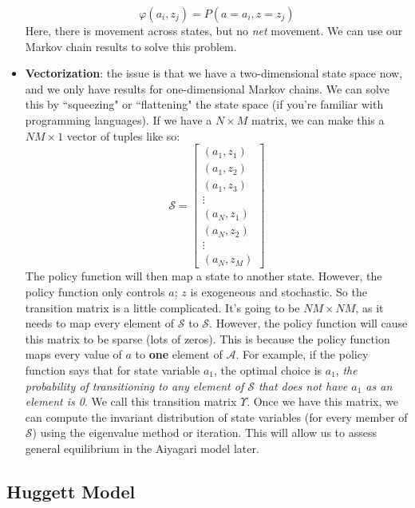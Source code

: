 \documentclass[12pt]{article}
\begin{document}
\begin{itemize}
    \[\varphi(a_i,z_j) = P(a=a_i,z=z_j)\]
    Here, there is movement across states, but no \textit{net} movement. We can use our Markov chain results to solve this problem.
    \item \textbf{Vectorization}: the issue is that we have a two-dimensional state space now, and we only have results for one-dimensional Markov chains. We can solve this by ``squeezing" or ``flattening" the state space (if you're familiar with programming languages). If we have a $N\times M$ matrix, we can make this a $NM\times 1$ vector of tuples like so:
    \[\mathcal{S} = \begin{bmatrix}
    (a_1, z_1) \\
    (a_1, z_2) \\
    (a_1, z_3) \\
    \vdots \\
    (a_N, z_1) \\
    (a_N, z_2) \\
    \vdots \\
    (a_N, z_M)
    \end{bmatrix}\]
    The policy function will then map a state to another state. However, the policy function only controls $a$; $z$ is exogeneous and stochastic. So the transition matrix is a little complicated. It's going to be $NM \times NM$, as it needs to map every element of $\mathcal{S}$ to $\mathcal{S}$. However, the policy function will cause this matrix to be sparse (lots of zeros). This is because the policy function maps every value of $a$ to \textbf{one} element of $\mathcal{A}$. For example, if the policy function says that for state variable $a_1$, the optimal choice is $a_1$, \textit{the probability of transitioning to any element of $\mathcal{S}$ that does not have $a_1$ as an element is 0}. We call this transition matrix $\Upsilon$. Once we have this matrix, we can compute the invariant distribution of state variables (for every member of $\mathcal{S}$) using the eigenvalue method or iteration. This will allow us to assess general equilibrium in the Aiyagari model later.
\end{itemize}

\subsection{Huggett Model}
\end{document}
